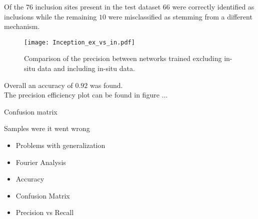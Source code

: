 Of the $76$ inclusion sites present in the test dataset $66$ were correctly identified as inclusions while the remaining $10$ were misclassified as stemming from a different mechanism. 

\begin{figure}
  \texttt{[image: Inception\_ex\_vs\_in.pdf]}
\caption{Comparison of the precision between networks trained excluding in-situ data and including in-situ data.}
\label{fig:Inception_ex_vs_in}
\end{figure}

Overall an accuracy of $0.92$ was found. \\

The precision efficiency plot can be found in figure ...

Confusion matrix

Samples were it went wrong


\begin{itemize}
\item Problems with generalization
\item Fourier Analysis
\item Accuracy
\item Confusion Matrix
\item Precision vs Recall
\end{itemize}

